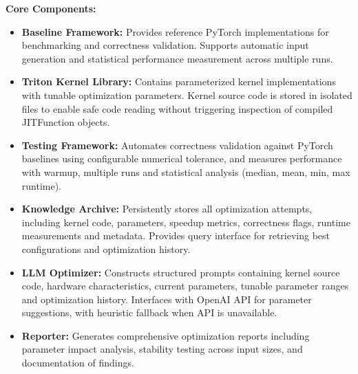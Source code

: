 \documentclass{article}
\begin{document}
\textbf{Core Components:}
\begin{itemize}
    \item {\textbf{Baseline Framework:} Provides reference PyTorch implementations for benchmarking and correctness validation. Supports automatic input generation and statistical performance measurement across multiple runs.}
    \item {\textbf{Triton Kernel Library:} Contains parameterized kernel implementations with tunable optimization parameters. Kernel source code is stored in isolated files to enable safe code reading without triggering inspection of compiled JITFunction objects.}
    \item {\textbf{Testing Framework:} Automates correctness validation against PyTorch baselines using configurable numerical tolerance, and measures performance with warmup, multiple runs and statistical analysis (median, mean, min, max runtime).}
    \item {\textbf{Knowledge Archive:} Persistently stores all optimization attempts, including kernel code, parameters, speedup metrics, correctness flags, runtime measurements and metadata. Provides query interface for retrieving best configurations and optimization history.}
    \item {\textbf{LLM Optimizer:} Constructs structured prompts containing kernel source code, hardware characteristics, current parameters, tunable parameter ranges and optimization history. Interfaces with OpenAI API for parameter suggestions, with heuristic fallback when API is unavailable.}
    \item {\textbf{Reporter:} Generates comprehensive optimization reports including parameter impact analysis, stability testing across input sizes, and documentation of findings.}
\end{itemize}
\end{document}
